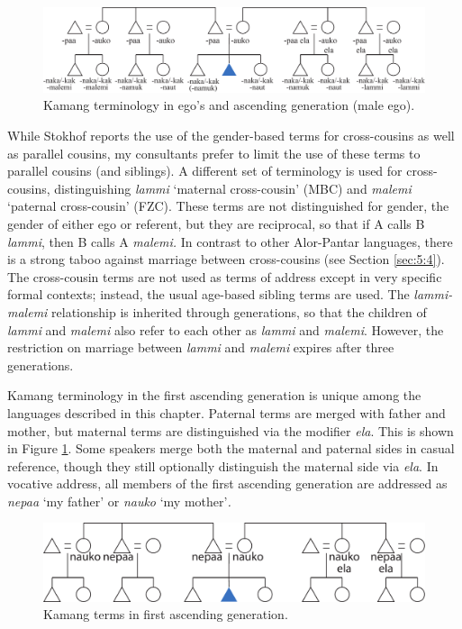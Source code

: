 \begin{figure}
\includegraphics[width=\textwidth]{figures/Holton_ch5_fig12.pdf}
\caption{Kamang terminology in ego's and ascending generation (male ego). }
\end{figure}  

 

While Stokhof reports the use of the gender-based terms for cross-cousins as well as parallel cousins, my consultants prefer to limit the use of these terms to parallel cousins (and siblings). A different set of terminology is used for cross-cousins, distinguishing \textit{lammi} `maternal cross-cousin' (MBC) and \textit{malemi} `paternal cross-cousin' (FZC). These terms are not distinguished for gender, the gender of either ego or referent, but they are reciprocal, so that if A calls B \textit{lammi}, then B calls A \textit{malemi.} In contrast to other Alor-Pantar languages, there is a strong taboo against marriage between cross-cousins (see Section \ref{sec:5:4}). The cross-cousin terms are not used as terms of address except in very specific formal contexts; instead, the usual age-based sibling terms are used. The \textit{lammi-malemi} relationship is inherited through generations, so that the children of \textit{lammi} and \textit{malemi} also refer to each other as \textit{lammi} and \textit{malemi}. However, the restriction on marriage between \textit{lammi} and \textit{malemi} expires after three generations.

Kamang terminology in the first ascending generation is unique among the languages described in this chapter. Paternal terms are merged with father and mother, but maternal terms are distinguished via the modifier \textit{ela}. This is shown in Figure \ref{fig_kamang_ascending}. Some speakers merge both the maternal and paternal sides in casual reference, though they still optionally distinguish the maternal side via \textit{ela}. In vocative address, all members of the first ascending generation are addressed as \textit{nepaa} `my father' or \textit{nauko} `my mother'\textit{.} 

\begin{figure}
\includegraphics[width=\textwidth]{figures/Holton_ch5_fig13.pdf}
\caption{Kamang terms in first ascending generation.}
\label{fig_kamang_ascending}
\end{figure}  
 


